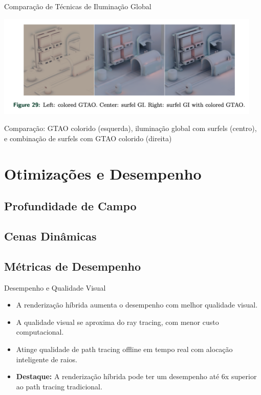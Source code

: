 \documentclass[aspectratio=169,xcolor=table]{beamer}
\begin{document}
\begin{frame}{Comparação de Técnicas de Iluminação Global}
    \begin{center}
        \includegraphics[width=0.95\textwidth]{surfel-comparacao}
    \end{center}
    \begin{center}
        \small{Comparação: GTAO colorido (esquerda), iluminação global com surfels (centro),\\
        e combinação de surfels com GTAO colorido (direita)}
    \end{center}
\end{frame}

\section{Otimizações e Desempenho}
\subsection{Profundidade de Campo}
\subsection{Cenas Dinâmicas}
\subsection{Métricas de Desempenho}

\begin{frame}{Desempenho e Qualidade Visual}
    \begin{itemize}
        \item A renderização híbrida aumenta o desempenho com melhor qualidade visual.
        \item A qualidade visual se aproxima do ray tracing, com menor custo computacional.
        \item Atinge qualidade de path tracing offline em tempo real com alocação inteligente de raios.
        \item \textbf{Destaque:} A renderização híbrida pode ter um desempenho até 6x superior ao path tracing tradicional.
    \end{itemize}
\end{frame}
\end{document}
